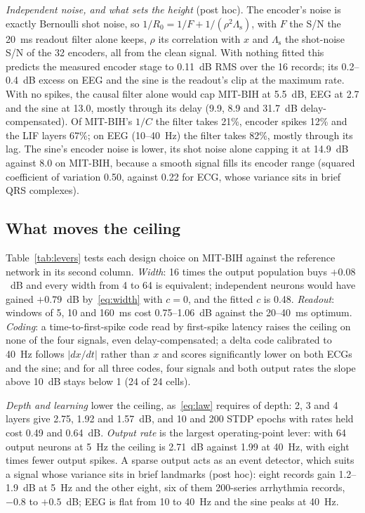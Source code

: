 \documentclass[conference]{IEEEtran}
\newcommand{\SN}{R}            %
\newcommand{\dB}{~dB}
\begin{document}
\emph{Independent noise, and what sets the height} (post hoc). The encoder's
noise is exactly Bernoulli shot noise, so
$1/\SN_0 = 1/F + 1/(\rho^2\Lambda_\mathrm{s})$, with $F$ the S/N the 20~ms
readout filter alone keeps, $\rho$ its correlation with $x$ and
$\Lambda_\mathrm{s}$ the shot-noise S/N of the 32 encoders, all from the clean
signal. With nothing fitted this predicts the measured encoder stage to
0.11\dB{} RMS over the 16 records; its 0.2--0.4\dB{} excess on EEG and the
sine is the readout's clip at the maximum rate. With no spikes, the causal
filter alone would cap MIT-BIH at 5.5\dB, EEG at 2.7 and the sine at 13.0,
mostly through its delay (9.9, 8.9 and 31.7\dB{} delay-compensated). Of
MIT-BIH's $1/C$ the filter takes 21\%, encoder spikes 12\% and the LIF layers
67\%; on EEG (10--40~Hz) the filter takes 82\%, mostly through its lag. The
sine's encoder noise is lower, its shot noise alone capping it at 14.9\dB{}
against 8.0 on MIT-BIH, because a smooth signal fills its encoder range
(squared coefficient of variation 0.50, against 0.22 for ECG, whose variance
sits in brief QRS complexes).

\subsection{What moves the ceiling}
\label{sec:levers}



Table~\ref{tab:levers} tests each design choice on MIT-BIH against the
reference network in its second column. \emph{Width}: 16 times the output
population buys $+0.08$\dB{} and every width from 4 to 64 is equivalent;
independent neurons would have gained $+0.79$\dB{} by~\eqref{eq:width} with
$c=0$, and the fitted $c$ is 0.48. \emph{Readout}: windows of 5, 10 and 160~ms
cost 0.75--1.06\dB{} against the 20--40~ms optimum. \emph{Coding}: a
time-to-first-spike code read by first-spike latency raises the ceiling on
none of the four signals, even delay-compensated; a delta code calibrated to
40~Hz follows $|dx/dt|$ rather than $x$ and scores significantly lower on both
ECGs and the sine; and for all three codes, four signals and both output rates
the slope above 10\dB{} stays below 1 (24 of 24 cells).

\emph{Depth and learning} lower the ceiling, as~\eqref{eq:law} requires of
depth: 2, 3 and 4 layers give 2.75, 1.92 and 1.57\dB, and 10 and 200 STDP
epochs with rates held cost 0.49 and 0.64\dB. \emph{Output rate} is the
largest operating-point lever: with 64 output neurons at 5~Hz the ceiling is
2.71\dB{} against 1.99 at 40~Hz, with eight times fewer output spikes. A
sparse output acts as an event detector, which suits a signal whose variance
sits in brief landmarks (post hoc): eight records gain 1.2--1.9\dB{} at 5~Hz
and the other eight, six of them 200-series arrhythmia records, $-0.8$ to
$+0.5$\dB; EEG is flat from 10 to 40~Hz and the sine peaks at 40~Hz.
\end{document}
